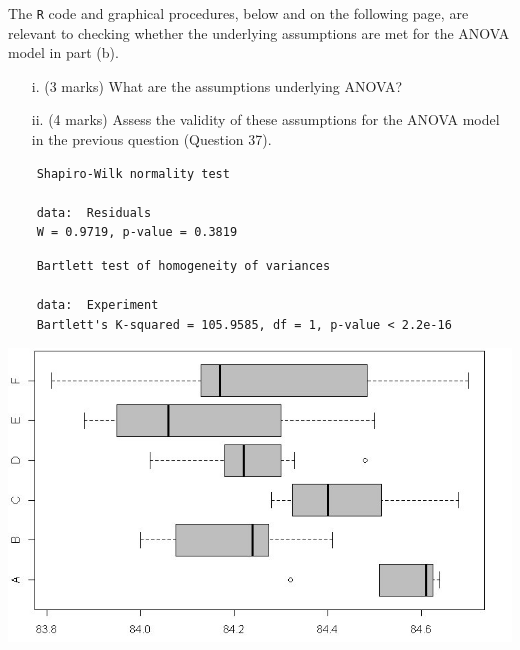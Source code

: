 \documentclass[a4paper,12pt]{article}
\begin{document}
The \texttt{R} code and graphical procedures, below and on the following page, are relevant to checking whether the underlying assumptions are met for the ANOVA model in part (b).
\begin{itemize}
	\item[i.] (3 marks) What are the assumptions underlying ANOVA?
	\item[ii.] (4 marks)  Assess the validity of these assumptions for the ANOVA model in the previous question (Question 37).
	
\end{itemize}
\begin{framed}
	\begin{verbatim}
	Shapiro-Wilk normality test
	
	data:  Residuals
	W = 0.9719, p-value = 0.3819
	\end{verbatim}
\end{framed}
\begin{framed}
	\begin{verbatim}
	Bartlett test of homogeneity of variances
	
	data:  Experiment
	Bartlett's K-squared = 105.9585, df = 1, p-value < 2.2e-16
	\end{verbatim}
\end{framed}
\begin{center}
	\includegraphics[scale=0.59]{images/ExamQ5boxplot}
\end{center}
\newpage
\end{document}
